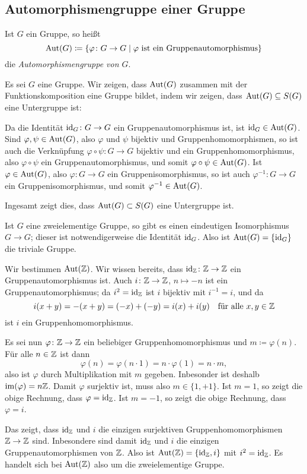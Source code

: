 \subsection{Automorphismengruppe einer Gruppe}\label{ssec: automorphism group of a group}
\begin{defi}
 Ist $G$ ein Gruppe, so heißt
 \[
  \mathrm{Aut}(G) \coloneqq \{\varphi \colon G \to G \mid \text{$\varphi$ ist ein Gruppenautomorphismus}\}
 \]
 die \emph{Automorphismengruppe von $G$}.
\end{defi}

Es sei $G$ eine Gruppe. Wir zeigen, dass $\mathrm{Aut}(G)$ zusammen mit der Funktionskomposition eine Gruppe bildet, indem wir zeigen, dass $\mathrm{Aut}(G) \subseteq S(G)$ eine Untergruppe ist:

Da die Identität $\mathrm{id}_G \colon G \to G$ ein Gruppenautomorphismus ist, ist $\mathrm{id}_G \in \mathrm{Aut}(G)$. Sind $\varphi, \psi \in \mathrm{Aut}(G)$, also $\varphi$ und $\psi$ bijektiv und Gruppenhomomorphismen, so ist auch die Verknüpfung $\varphi \circ \psi \colon G \to G$ bijektiv und ein Gruppenhomomorphismus, also $\varphi \circ \psi$ ein Gruppenautomorphismus, und somit $\varphi \circ \psi \in \mathrm{Aut}(G)$. Ist $\varphi \in \mathrm{Aut}(G)$, also $\varphi \colon G \to G$ ein Gruppenisomorphismus, so ist auch $\varphi^{-1} \colon G \to G$ ein Gruppenisomorphismus, und somit $\varphi^{-1} \in \mathrm{Aut}(G)$.

Ingesamt zeigt dies, dass $\mathrm{Aut}(G) \subset S(G)$ eine Untergruppe ist.

\begin{bsp}
 Ist $G$ eine zweielementige Gruppe, so gibt es einen eindeutigen Isomorphismus $G \to G$; dieser ist notwendigerweise die Identität $\mathrm{id}_G$. Also ist $\mathrm{Aut}(G) = \{\mathrm{id}_G\}$ die triviale Gruppe.
\end{bsp}

\begin{bsp}
 Wir bestimmen $\mathrm{Aut}(\mathbb{Z})$. Wir wissen bereits, dass $\mathrm{id}_{\mathbb{Z}} \colon \mathbb{Z} \to \mathbb{Z}$ ein Gruppenautomorphismus ist. Auch $i \colon \mathbb{Z} \to \mathbb{Z}$, $n \mapsto -n$ ist ein Gruppenautomorphismus; da $i^2 = \mathrm{id}_{\mathbb{Z}}$ ist $i$ bijektiv mit $i^{-1} = i$, und da
 \[
  i(x+y)
  = -(x+y)
  = (-x) + (-y)
  = i(x) + i(y)
  \quad
  \text{für alle $x,y \in \mathbb{Z}$}
 \]
 ist $i$ ein Gruppenhomomorphismus.
 
 Es sei nun $\varphi \colon \mathbb{Z} \to \mathbb{Z}$ ein beliebiger Gruppenhomomorphismus und $m \coloneqq \varphi(n)$. Für alle $n \in \mathbb{Z}$ ist dann
 \[
  \varphi(n)
  = \varphi(n \cdot 1)
  = n \cdot \varphi(1)
  = n \cdot m,
 \]
 also ist $\varphi$ durch Multiplikation mit $m$ gegeben. Inbesonder ist deshalb $\mathrm{im}(\varphi) = n\mathbb{Z}$. Damit $\varphi$ surjektiv ist, muss also $m \in \{1,+1\}$. Ist $m = 1$, so zeigt die obige Rechnung, dass $\varphi = \mathrm{id}_{\mathbb{Z}}$. Ist $m = -1$, so zeigt die obige Rechnung, dass $\varphi = i$.
 
 Das zeigt, dass $\mathrm{id}_{\mathbb{Z}}$ und $i$ die einzigen surjektiven Gruppenhomomorphismen $\mathbb{Z} \to \mathbb{Z}$ sind. Inbesondere sind damit $\mathrm{id}_{\mathbb{Z}}$ und $i$ die einzigen Gruppenautomorphismen von $\mathbb{Z}$. Also ist $\mathrm{Aut}(\mathbb{Z}) = \{\mathrm{id}_{\mathbb{Z}}, i\}$ mit $i^2 = \mathrm{id}_{\mathbb{Z}}$. Es handelt sich bei $\mathrm{Aut}(\mathbb{Z})$ also um die zweielementige Gruppe.
\end{bsp}


